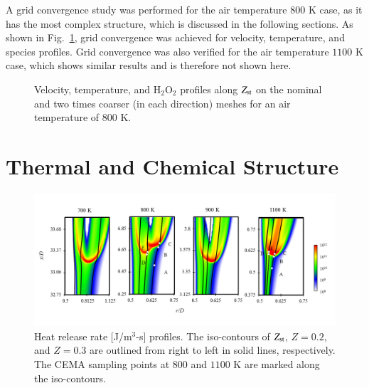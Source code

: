 \documentclass[review,3p,times]{elsarticle}
\begin{document}
A grid convergence study was performed for the air temperature $800$ K case, as it has the most complex structure, which is discussed in the following sections.  As shown in Fig.~\ref{fig:convergence}, grid convergence was achieved for velocity, temperature, and species profiles.  Grid convergence was also verified for the air temperature $1100$ K case, which shows similar results and is therefore not shown here.  

\begin{figure}
  \centering
  \scriptsize
  \hspace{-0.40625in}
  
  \hspace{-0.40625in}
  
  \hspace{-0.40625in}
  
  \normalsize
  \caption{Velocity, temperature, and H$_2$O$_2$ profiles along $Z_{\rm st}$ on the nominal and two times coarser (in each direction) meshes for an air temperature of $800$ K.}
  \label{fig:convergence}
\end{figure}



\section{Thermal and Chemical Structure} \label{sec:structure}

\begin{figure}[t]
  \centering
  \scriptsize
  \vspace{-0.1in}
  \includegraphics[width=1.0\textwidth]{HRR.png}
  \normalsize
  \vspace{-0.1in}
  \caption{Heat release rate [J/m$^3$-s] profiles.  The iso-contours of $Z_{\rm st}$, $Z = 0.2$, and $Z = 0.3$ are outlined from right to left in solid lines, respectively.  The CEMA sampling points at $800$ and $1100$ K are marked along the iso-contours.}
  \label{fig:HRR}
\end{figure}
\end{document}
